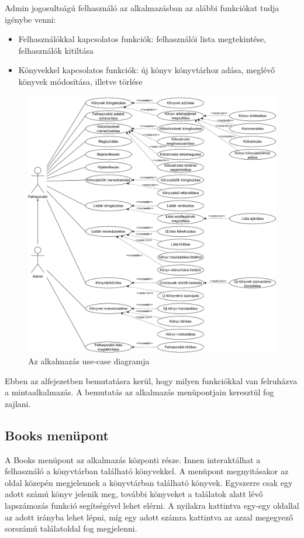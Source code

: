 \bigskip

\noindent Admin jogosultságú felhasználó az alkalmazásban az alábbi funkciókat tudja igénybe venni:
\begin{itemize}
    \item Felhasználókkal kapcsolatos funkciók: felhasználói lista megtekintése, felhasználók kitiltása
    \item Könyvekkel kapcsolatos funkciók: új könyv könyvtárhoz adása, meglévő könyvek módosítása, illetve törlése
\end{itemize}

\begin{figure}[H]
    \centering
    \includegraphics[scale=0.6]{images/graphlibrary-usecase-better.png}
    \caption{Az alkalmazás use-case diagramja}
\end{figure}

Ebben az alfejezetben bemutatásra kerül, hogy milyen funkciókkal van felruházva a mintaalkalmazás. A bemutatás az alkalmazás menüpontjain keresztül fog zajlani.

\subsection{Books menüpont}
A Books menüpont az alkalmazás központi része. Innen interaktálhat a felhasználó a könyvtárban található könyvekkel. A menüpont megnyitásakor az oldal közepén megjelennek a könyvtárban található könyvek. Egyszerre csak egy adott számú könyv jelenik meg, további könyveket a találatok alatt lévő lapszámozás funkció segítségével lehet elérni. A nyilakra kattintva egy-egy oldallal az adott irányba lehet lépni, míg egy adott számra kattintva az azzal megegyező sorszámú találatoldal fog megjelenni.

